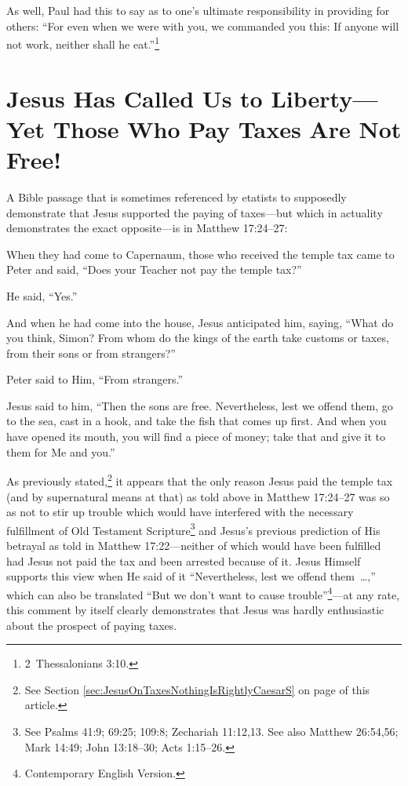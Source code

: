 \documentclass[letterpaper,12pt]{article}
\newenvironment{squotation}
  {\small\quotation}
  {\endquotation\normalsize}
\begin{document}
As well, Paul had this to say as to one's ultimate responsibility in providing for others: ``For even when we were with you, we commanded you this: If anyone will not work, neither shall he eat.''\footnote{2~Thessalonians 3:10.}

\section{Jesus Has Called Us to Liberty---Yet Those Who Pay Taxes Are Not Free!}
\label{sec:JesusHasCalledUsToLibertyYetThoseWhoPayTaxesAreNotFree}

A Bible passage that is sometimes referenced by etatists to supposedly demonstrate that Jesus supported the paying of taxes---but which in actuality demonstrates the exact opposite---is in Matthew 17:24--27:

\begin{squotation}
When they had come to Capernaum, those who received the temple tax came to Peter and said, ``Does your Teacher not pay the temple tax?''

He said, ``Yes.''

And when he had come into the house, Jesus anticipated him, saying, ``What do you think, Simon? From whom do the kings of the earth take customs or taxes, from their sons or from strangers?''

Peter said to Him, ``From strangers.''

Jesus said to him, ``Then the sons are free. Nevertheless, lest we offend them, go to the sea, cast in a hook, and take the fish that comes up first. And when you have opened its mouth, you will find a piece of money; take that and give it to them for Me and you.''
\end{squotation}

As previously stated,\footnote{See Section \ref{sec:JesusOnTaxesNothingIsRightlyCaesarS} on page \pageref{TempleTax} of this article.} it appears that the only reason Jesus paid the temple tax (and by supernatural means at that) as told above in Matthew 17:24--27 was so as not to stir up trouble which would have interfered with the necessary fulfillment of Old Testament Scripture\footnote{See Psalms 41:9; 69:25; 109:8; Zechariah 11:12,13. See also Matthew 26:54,56; Mark 14:49; John 13:18--30; Acts 1:15--26.} and Jesus's previous prediction of His betrayal as told in Matthew 17:22---neither of which would have been fulfilled had Jesus not paid the tax and been arrested because of it. Jesus Himself supports this view when He said of it ``Nevertheless, lest we offend \mbox{them \ldots,''} which can also be translated ``But we don't want to cause trouble''\footnote{Contemporary English Version.}---at any rate, this comment by itself clearly demonstrates that Jesus was hardly enthusiastic about the prospect of paying taxes.
\end{document}
